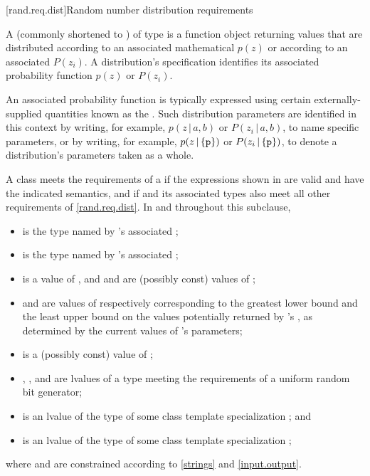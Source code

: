 
[rand.req.dist]{Random number distribution requirements}%
%

\pnum
A 
(commonly shortened to )
 of type 
is a function object
returning values
that are distributed according to
an associated mathematical 
$p(z)$
or according to
an associated 
$P(z_i)$.
A distribution's specification
identifies its associated probability function
$p(z)$ or $P(z_i)$.

\pnum
An associated probability function is typically expressed
using certain externally-supplied quantities
known as the .
Such distribution parameters are identified
in this context by writing, for example,
  $p(z\,|\,a,b)$ or $P(z_i\,|\,a,b)$,
  to name specific parameters,
or by writing, for example,
  $p(z\,|\left\{\texttt{\protect p}\right\})$
  or $P(z_i\,|\left\{\texttt{\protect p}\right\})$,
  to denote a distribution's parameters  taken as a whole.

\pnum
A class 
meets the requirements
of a 
if the expressions shown
in 
are valid and have the indicated semantics,
and if  and its associated types
also meet all other requirements
of \ref{rand.req.dist}.
In  and throughout this subclause,
\begin{itemize}
  \item
     is the type named by
    's associated ;
  \item
     is the type named by
    's associated ;
  \item
     is a
    value of ,
    and
     and  are (possibly const) values of ;
  \item
     and 
    are values of 
    respectively corresponding to
    the greatest lower bound and the least upper bound
    on the values potentially returned by 's ,
    as determined by the current values of 's parameters;
  \item
     is a (possibly const) value of ;
  \item
    , , and  are lvalues of a type
    meeting the requirements
    of a uniform random bit generator;
  \item
     is an lvalue of the type of some class template specialization
     ;
  and
  \item
     is an lvalue of the type of some class template specialization
     ;
\end{itemize}
where  and  are constrained
according to \ref{strings} and \ref{input.output}.

